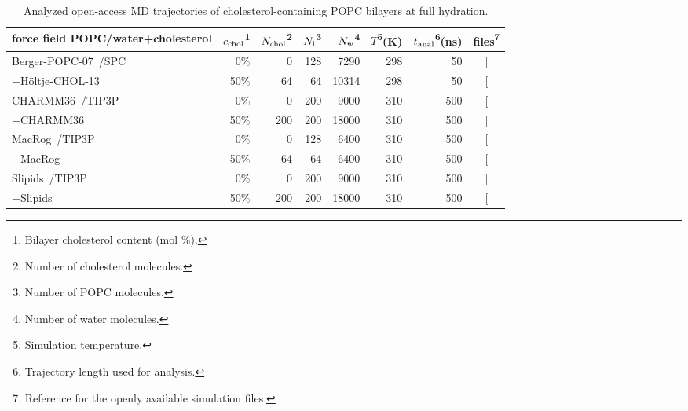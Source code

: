 \documentclass[journal=jcisd8,manuscript=article,layout=twocolumn]{achemso}
\begin{document}
\begin{table}[]
\caption{Analyzed open-access MD trajectories of cholesterol-containing POPC bilayers at full hydration.}
\begin{minipage}[t]{\columnwidth}
\resizebox{\columnwidth}{!} {
\begin{tabular}{lrrrrrrc}
force field POPC/water+cholesterol &
$c_{{\rm chol}}$\footnote{Bilayer cholesterol content (mol \%).}  &
$N_{\rm chol}$\footnote{Number of cholesterol molecules.}  &
$N_{\rm l}$\footnote{Number of POPC molecules.} &
$N_{\rm w}$\footnote{Number of water molecules.}  &
$T$\footnote{Simulation temperature.}(K) &
$t_{{\rm anal}}$\footnote{Trajectory length used for analysis.}(ns) &
files\footnote{Reference for the openly available simulation files.} 
\tabularnewline
\hline 
Berger-POPC-07~\cite{ollila07a}/SPC\cite{berendsen81}
	& 0\%	& 0	& 128	& 7290  & 298  & 50 & {[}\!\!\citenum{bergerFILESpopc}{]} \tabularnewline
+H\"{o}ltje-CHOL-13~\cite{holtje01,ferreira13} 
	& 50\%	& 64	& 64		& 10314  & 298  & 50  & {[}\!\!\citenum{bergerFILESpopc50chol}{]} \tabularnewline[1.0ex]
CHARMM36~\cite{klauda10}/TIP3P\cite{mackerell98}
	& 0\%	& 0 	& 200 	& 9000  & 310  & 500  & {[}\!\!\citenum{T310charmm36files}{]} \tabularnewline
+CHARMM36~\cite{lim12} 
 	& 50\%	& 200	& 200		& 18000  & 310  & 500  & {[}\!\!\citenum{T310charmm36files50perCHOL}{]} \tabularnewline[1.0ex]
MacRog~\cite{kulig15}/TIP3P\cite{Jorgensen:1983a}
	& 0\%	& 0	& 128	& 6400  & 310  & 500  & {[}\!\!\citenum{macrogCHOLfiles}{]} \tabularnewline
+MacRog~\cite{kulig15}
 	& 50\%	& 64	& 64		& 6400  & 310  & 500  & {[}\!\!\citenum{macrogCHOLfiles}{]} \tabularnewline[1.0ex]
Slipids~\cite{jambeck12b}/TIP3P\cite{Jorgensen:1983a}
	& 0\%	& 0	& 200	& 9000 & 310 & 500  & {[}\!\!\citenum{slipidsFILESpopcchol}{]} \tabularnewline
+Slipids~\cite{jambeck13chol}
 	& 50\%	&200& 200	& 18000 & 310 & 500 & {[}\!\!\citenum{slipidsFILESpopcchol}{]}\tabularnewline
\end{tabular}
}
\end{minipage}
\label{tab:chol}
\end{table}
\end{document}
